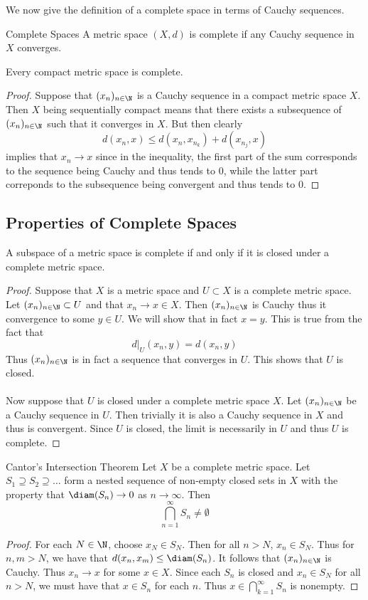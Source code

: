We now give the definition of a complete space in terms of Cauchy sequences. 

\begin{defn}{Complete Spaces}{} A metric space $(X,d)$ is complete if any Cauchy sequence in $X$ converges. 
\end{defn}

\begin{prp}{}{} Every compact metric space is complete. \tcbline
\begin{proof}
Suppose that $(x_n)_{n\in\N}$ is a Cauchy sequence in a compact metric space $X$. Then $X$ being sequentially compact means that there exists a subsequence of $(x_n)_{n\in\N}$ such that it converges in $X$. But then clearly $$d(x_n,x)\leq d(x_n,x_{n_k})+d(x_{n_j},x)$$ implies that $x_n\to x$ since in the inequality, the first part of the sum corresponds to the sequence being Cauchy and thus tends to $0$, while the latter part correponds to the subsequence being convergent and thus tends to $0$. 
\end{proof}
\end{prp}

\subsection{Properties of Complete Spaces}
\begin{prp}{}{} A subspace of a metric space is complete if and only if it is closed under a complete metric space. \tcbline
\begin{proof}
Suppose that $X$ is a metric space and $U\subset X$ is a complete metric space. Let $(x_n)_{n\in\N}\subset U$ and that $x_n\to x\in X$. Then $(x_n)_{n\in\N}$ is Cauchy thus it convergence to some $y\in U$. We will show that in fact $x=y$. This is true from the fact that $$d|_U(x_n,y)=d(x_n,y)$$ Thus $(x_n)_{n\in\N}$ is in fact a sequence that converges in $U$. This shows that $U$ is closed. \\~\\
Now suppose that $U$ is closed under a complete metric space $X$. Let $(x_n)_{n\in\N}$ be a Cauchy sequence in $U$. Then trivially it is also a Cauchy sequence in $X$ and thus is convergent. Since $U$ is closed, the limit is necessarily in $U$ and thus $U$ is complete. 
\end{proof}
\end{prp}

\begin{thm}{Cantor's Intersection Theorem}{} Let $X$ be a complete metric space. Let $S_1\supseteq S_2\supseteq\dots$ form a nested sequence of non-empty closed sets in $X$ with the property that $\diam(S_n)\to 0$ as $n\to\infty$. Then $$\bigcap_{n=1}^\infty S_n\neq\emptyset$$ \tcbline
\begin{proof}
For each $N\in\N$, choose $x_N\in S_N$. Then for all $n>N$, $x_n\in S_N$. Thus for $n,m>N$, we have that $d(x_n,x_m)\leq\diam(S_n)$. It follows that $(x_n)_{n\in\N}$ is Cauchy. Thus $x_n\to x$ for some $x\in X$. Since each $S_n$ is closed and $x_n\in S_N$ for all $n>N$, we must have that $x\in S_n$ for each $n$. Thus $x\in\bigcap_{k=1}^\infty S_n$ is nonempty. 
\end{proof}
\end{thm}

